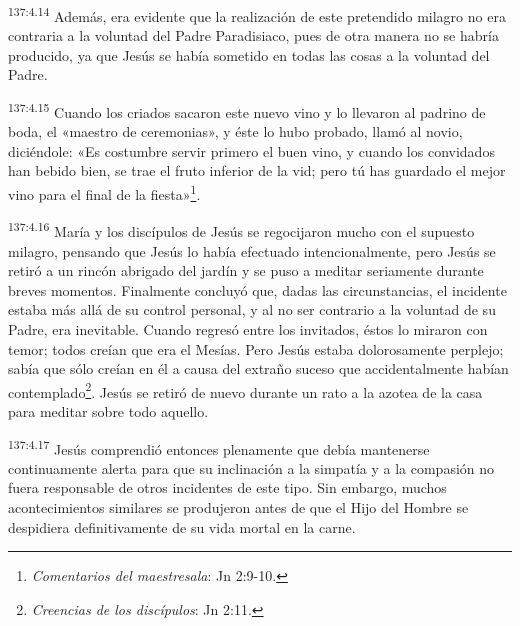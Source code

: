 \par 
\textsuperscript{137:4.14} Además, era evidente que la realización de este pretendido milagro no era contraria a la voluntad del Padre Paradisiaco, pues de otra manera no se habría producido, ya que Jesús se había sometido en todas las cosas a la voluntad del Padre.

\par 
\textsuperscript{137:4.15} Cuando los criados sacaron este nuevo vino y lo llevaron al padrino de boda, el «maestro de ceremonias», y éste lo hubo probado, llamó al novio, diciéndole: «Es costumbre servir primero el buen vino, y cuando los convidados han bebido bien, se trae el fruto inferior de la vid; pero tú has guardado el mejor vino para el final de la fiesta»\footnote{\textit{Comentarios del maestresala}: Jn 2:9-10.}.

\par 
\textsuperscript{137:4.16} María y los discípulos de Jesús se regocijaron mucho con el supuesto milagro, pensando que Jesús lo había efectuado intencionalmente, pero Jesús se retiró a un rincón abrigado del jardín y se puso a meditar seriamente durante breves momentos. Finalmente concluyó que, dadas las circunstancias, el incidente estaba más allá de su control personal, y al no ser contrario a la voluntad de su Padre, era inevitable. Cuando regresó entre los invitados, éstos lo miraron con temor; todos creían que era el Mesías. Pero Jesús estaba dolorosamente perplejo; sabía que sólo creían en él a causa del extraño suceso que accidentalmente habían contemplado\footnote{\textit{Creencias de los discípulos}: Jn 2:11.}. Jesús se retiró de nuevo durante un rato a la azotea de la casa para meditar sobre todo aquello.

\par 
\textsuperscript{137:4.17} Jesús comprendió entonces plenamente que debía mantenerse continuamente alerta para que su inclinación a la simpatía y a la compasión no fuera responsable de otros incidentes de este tipo. Sin embargo, muchos acontecimientos similares se produjeron antes de que el Hijo del Hombre se despidiera definitivamente de su vida mortal en la carne.


